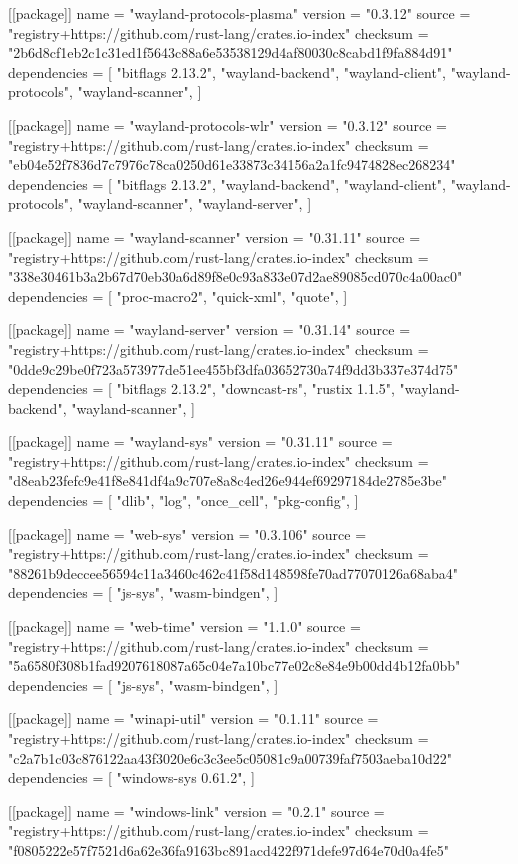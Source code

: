 [[package]]
name = "wayland-protocols-plasma"
version = "0.3.12"
source = "registry+https://github.com/rust-lang/crates.io-index"
checksum = "2b6d8cf1eb2c1c31ed1f5643c88a6e53538129d4af80030c8cabd1f9fa884d91"
dependencies = [
 "bitflags 2.13.2",
 "wayland-backend",
 "wayland-client",
 "wayland-protocols",
 "wayland-scanner",
]

[[package]]
name = "wayland-protocols-wlr"
version = "0.3.12"
source = "registry+https://github.com/rust-lang/crates.io-index"
checksum = "eb04e52f7836d7c7976c78ca0250d61e33873c34156a2a1fc9474828ec268234"
dependencies = [
 "bitflags 2.13.2",
 "wayland-backend",
 "wayland-client",
 "wayland-protocols",
 "wayland-scanner",
 "wayland-server",
]

[[package]]
name = "wayland-scanner"
version = "0.31.11"
source = "registry+https://github.com/rust-lang/crates.io-index"
checksum = "338e30461b3a2b67d70eb30a6d89f8e0c93a833e07d2ae89085cd070c4a00ac0"
dependencies = [
 "proc-macro2",
 "quick-xml",
 "quote",
]

[[package]]
name = "wayland-server"
version = "0.31.14"
source = "registry+https://github.com/rust-lang/crates.io-index"
checksum = "0dde9c29be0f723a573977de51ee455bf3dfa03652730a74f9dd3b337e374d75"
dependencies = [
 "bitflags 2.13.2",
 "downcast-rs",
 "rustix 1.1.5",
 "wayland-backend",
 "wayland-scanner",
]

[[package]]
name = "wayland-sys"
version = "0.31.11"
source = "registry+https://github.com/rust-lang/crates.io-index"
checksum = "d8eab23fefc9e41f8e841df4a9c707e8a8c4ed26e944ef69297184de2785e3be"
dependencies = [
 "dlib",
 "log",
 "once_cell",
 "pkg-config",
]

[[package]]
name = "web-sys"
version = "0.3.106"
source = "registry+https://github.com/rust-lang/crates.io-index"
checksum = "88261b9deccee56594c11a3460c462c41f58d148598fe70ad77070126a68aba4"
dependencies = [
 "js-sys",
 "wasm-bindgen",
]

[[package]]
name = "web-time"
version = "1.1.0"
source = "registry+https://github.com/rust-lang/crates.io-index"
checksum = "5a6580f308b1fad9207618087a65c04e7a10bc77e02c8e84e9b00dd4b12fa0bb"
dependencies = [
 "js-sys",
 "wasm-bindgen",
]

[[package]]
name = "winapi-util"
version = "0.1.11"
source = "registry+https://github.com/rust-lang/crates.io-index"
checksum = "c2a7b1c03c876122aa43f3020e6c3c3ee5c05081c9a00739faf7503aeba10d22"
dependencies = [
 "windows-sys 0.61.2",
]

[[package]]
name = "windows-link"
version = "0.2.1"
source = "registry+https://github.com/rust-lang/crates.io-index"
checksum = "f0805222e57f7521d6a62e36fa9163bc891acd422f971defe97d64e70d0a4fe5"

